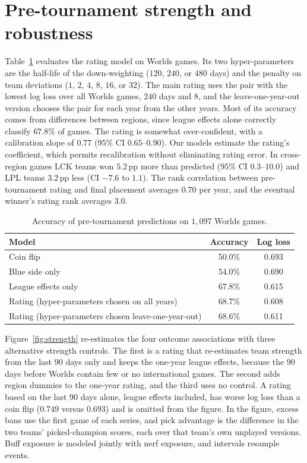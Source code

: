 \documentclass[11pt]{article}
\newcommand{\pp}{\,pp}
\begin{document}
\section{Pre-tournament strength and robustness}
\label{app:strength}
Table~\ref{tab:rating} evaluates the rating model on Worlds games. Its two hyper-parameters are the half-life of the down-weighting ($120$, $240$, or $480$ days) and the penalty on team deviations ($1$, $2$, $4$, $8$, $16$, or $32$). The main rating uses the pair with the lowest log loss over all Worlds games, $240$ days and $8$, and the leave-one-year-out version chooses the pair for each year from the other years. Most of its accuracy comes from differences between regions, since league effects alone correctly classify $67.8\%$ of games. The rating is somewhat over-confident, with a calibration slope of $0.77$ ($95\%$ CI $0.65$--$0.90$). Our models estimate the rating's coefficient, which permits recalibration without eliminating rating error. In cross-region games LCK teams won $5.2$\pp{} more than predicted ($95\%$ CI $0.3$--$10.0$) and LPL teams $3.2$\pp{} less (CI $-7.6$ to $1.1$). The rank correlation between pre-tournament rating and final placement averages $0.70$ per year, and the eventual winner's rating rank averages $3.0$.

\begin{table}[h]
\centering
\small
\caption{Accuracy of pre-tournament predictions on $1{,}097$ Worlds games.}
\label{tab:rating}
\begin{tabular}{lcc}
\toprule
Model & Accuracy & Log loss \\
\midrule
Coin flip & 50.0\% & 0.693 \\
Blue side only & 54.0\% & 0.690 \\
League effects only & 67.8\% & 0.615 \\
Rating (hyper-parameters chosen on all years) & 68.7\% & 0.608 \\
Rating (hyper-parameters chosen leave-one-year-out) & 68.6\% & 0.611 \\
\bottomrule
\end{tabular}
\end{table}

Figure~\ref{fig:strength} re-estimates the four outcome associations with three alternative strength controls. The first is a rating that re-estimates team strength from the last $90$ days only and keeps the one-year league effects, because the $90$ days before Worlds contain few or no international games. The second adds region dummies to the one-year rating, and the third uses no control. A rating based on the last $90$ days alone, league effects included, has worse log loss than a coin flip ($0.749$ versus $0.693$) and is omitted from the figure. In the figure, excess bans use the first game of each series, and pick advantage is the difference in the two teams' picked-champion scores, each over that team's own unplayed versions. Buff exposure is modeled jointly with nerf exposure, and intervals resample events.
\end{document}
